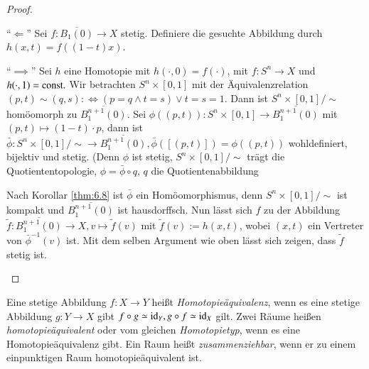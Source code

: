 \documentclass[a4paper,10pt]{scrartcl}
\begin{document}
\begin{proof}
 \begin{seg}{"`$\Longleftarrow$"'}
  Sei $f: \overline{B_1(0)}\to X$ stetig. Definiere die gesuchte Abbildung durch $h(x,t)=f((1-t)x)$.
 \end{seg}
\begin{seg}{"`$\implies$"'}
 Sei $h$ eine Homotopie mit $h(\cdot, 0)=f(\cdot)$, mit $f:S^n \to X$ und $h(\cdot, 1)=\text{const}.$
\fixme[fig42]
Wir betrachten $S^n\times[0,1]$ mit der Äquivalenzrelation $(p,t)\sim (q,s) :\iff (p=q \land t=s) \lor t=s=1$. Dann ist $S^n\times[0,1]/\sim$ homöomorph zu $\overline{B_1^{n+1}(0)}$. Sei $\phi ((p,t)):S^n\times[0,1]\to \overline{B_1^{n+1}(0)}$ mit $(p,t)\mapsto (1-t)\cdot p$, dann ist $\bar \phi: S^n \times[0,1]/\sim \to \overline{B_1^{n+1}(0)}, \bar \phi([(p,t)])=\phi((p,t))$ wohldefiniert, bijektiv und stetig. (Denn $\phi$ ist stetig, $S^n\times [0,1]/\sim$ trägt die Quotiententopologie, $\phi=\bar \phi \circ q $, $q$ die Quotientenabbildung\\
\begin{center}
\end{center}

Nach Korollar \ref{thm:6.8} ist $\bar \phi$ ein Homöomorphismus, denn $S^n\times [0,1]/\sim$ ist kompakt und $\overline{B_1^{n+1}(0)}$ ist hausdorffsch. Nun lässt sich $f$ zu der Abbildung $\tilde f: \overline{B_1^{n+1}(0)}\to X, v\mapsto \tilde f(v)$ mit $\tilde f(v):= h(x,t)$,
wobei $(x,t)$ ein Vertreter von $\bar \phi^{-1}(v)$ ist. Mit dem selben Argument wie oben lässt sich zeigen, dass $\tilde f$ stetig ist.
\end{seg}
\end{proof}
\begin{df}
 Eine stetige Abbildung $f: X\to Y$ heißt \emph{Homotopieäquivalenz}, wenn es eine stetige Abbildung $g: Y\to X$ gibt $f\circ g \simeq \operatorname{id}_Y, g\circ f \simeq \operatorname{id}_X$ gilt. Zwei
Räume heißen \emph{homotopieäquivalent} oder vom gleichen \emph{Homotopietyp}, wenn es eine Homotopieäquivalenz gibt. Ein Raum heißt \emph{zusammenziehbar}, wenn er zu einem einpunktigen Raum homotopieäquivalent ist.
\end{df}
\end{document}
